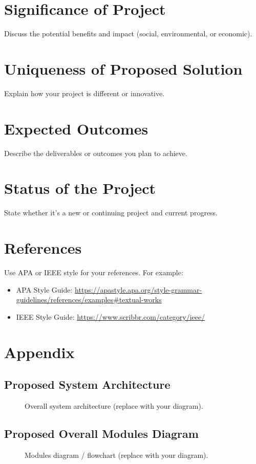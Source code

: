 \documentclass[12pt,a4paper]{article}
\begin{document}
\section{Significance of Project}
Discuss the potential benefits and impact (social, environmental, or economic).

\section{Uniqueness of Proposed Solution}
Explain how your project is different or innovative.

\section{Expected Outcomes}
Describe the deliverables or outcomes you plan to achieve.

\section{Status of the Project}
State whether it’s a new or continuing project and current progress.

\section{References}
Use APA or IEEE style for your references.  
For example:
\begin{itemize}
  \item APA Style Guide: \url{https://apastyle.apa.org/style-grammar-guidelines/references/examples#textual-works}
  \item IEEE Style Guide: \url{https://www.scribbr.com/category/ieee/}
\end{itemize}

\section{Appendix}
\subsection{Proposed System Architecture}
\begin{figure}[H]
  \centering
  \fbox{\rule{0pt}{2in}\rule{0.9\linewidth}{0pt}}
  \caption{Overall system architecture (replace with your diagram).}
\end{figure}

\subsection{Proposed Overall Modules Diagram}
\begin{figure}[H]
  \centering
  \fbox{\rule{0pt}{2in}\rule{0.9\linewidth}{0pt}}
  \caption{Modules diagram / flowchart (replace with your diagram).}
\end{figure}
\end{document}
